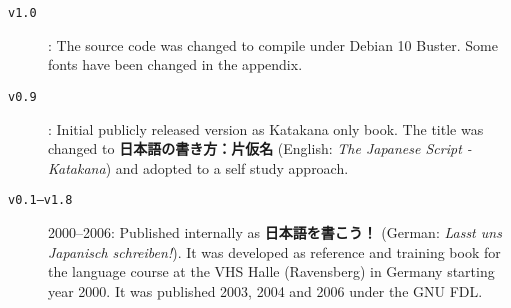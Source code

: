 \begin{flushleft}
{\begin{description}
        \item[\jfontsizenine\texttt{v1.0}]: The source code was changed to
                compile under Debian 10 Buster. Some fonts have been changed in
                the appendix.

        \item[\jfontsizenine\texttt{v0.9}]:  Initial
                publicly released version as Katakana only book.  The title was
                changed to \textbf{日本語の書き方：片仮名} (English:
                \textit{The Japanese Script - Katakana}) and adopted to a self
                study approach.

        \item[\jfontsizenine\texttt{v0.1–v1.8}] 2000–2006: Published internally
                as \textbf{日本語を書こう！} (German: \textit{Lasst uns
                Japanisch schreiben!}). It was developed as reference and
                training book for the language course at the VHS Halle
                (Ravensberg) in Germany starting year 2000. It was published
                2003, 2004 and 2006 under the GNU FDL.

\end{description}
}
\end{flushleft}
\endgroup
\clearpage
\newpage

